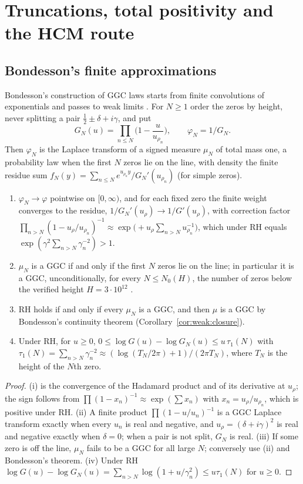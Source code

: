 \section{Truncations, total positivity and the HCM route}\label{ht:sec:density}

\subsection{Bondesson's finite approximations}

Bondesson's construction of GGC laws starts from finite convolutions of exponentials and passes to weak limits \cite{Bondesson}. For $N\ge1$ order the zeros by height, never splitting a pair $\tfrac12\pm\delta+i\gamma$, and put
\[
G_N(u)=\prod_{n\le N}\Big(1-\frac u{u_{\rho_n}}\Big),\qquad\varphi_N=1/G_N .
\]
Then $\varphi_N$ is the Laplace transform of a signed measure $\mu_N$ of total mass one, a probability law when the first $N$ zeros lie on the line, with density the finite residue sum $f_N(y)=\sum_{n\le N}e^{u_{\rho_n}y}/G_N'(u_{\rho_n})$ (for simple zeros).

\begin{proposition}[Truncations]\label{ht:prop:trunc}
\begin{enumerate}
\item[(i)] $\varphi_N\to\varphi$ pointwise on $[0,\infty)$, and for each fixed zero the finite weight converges to the residue, $1/G_N'(u_\rho)\to1/G'(u_\rho)$, with correction factor $\prod_{n>N}(1-u_\rho/u_{\rho_n})^{-1}\approx\exp\big(+u_\rho\sum_{n>N}u_{\rho_n}^{-1}\big)$, which under RH equals $\exp(\gamma^2\sum_{n>N}\gamma_n^{-2})>1$.
\item[(ii)] $\mu_N$ is a GGC if and only if the first $N$ zeros lie on the line; in particular it is a GGC, unconditionally, for every $N\le N_0(H)$, the number of zeros below the verified height $H=3\cdot10^{12}$ \cite{PT21}.
\item[(iii)] RH holds if and only if every $\mu_N$ is a GGC, and then $\mu$ is a GGC by Bondesson's continuity theorem (Corollary~\ref{cor:weak:closure}).
\item[(iv)] Under RH, for $u\ge0$, $0\le\log G(u)-\log G_N(u)\le u\,\tau_1(N)$ with $\tau_1(N)=\sum_{n>N}\gamma_n^{-2}\approx(\log(T_N/2\pi)+1)/(2\pi T_N)$, where $T_N$ is the height of the $N$th zero.
\end{enumerate}
\end{proposition}

\begin{proof}
(i) is the convergence of the Hadamard product and of its derivative at $u_\rho$; the sign follows from $\prod(1-x_n)^{-1}\approx\exp(\sum x_n)$ with $x_n=u_\rho/u_{\rho_n}$, which is positive under RH. (ii) A finite product $\prod(1-u/u_n)^{-1}$ is a GGC Laplace transform exactly when every $u_n$ is real and negative, and $u_\rho=(\delta+i\gamma)^2$ is real and negative exactly when $\delta=0$; when a pair is not split, $G_N$ is real. (iii) If some zero is off the line, $\mu_N$ fails to be a GGC for all large $N$; conversely use (ii) and Bondesson's theorem. (iv) Under RH $\log G(u)-\log G_N(u)=\sum_{n>N}\log(1+u/\gamma_n^2)\le u\tau_1(N)$ for $u\ge0$.
\end{proof}

